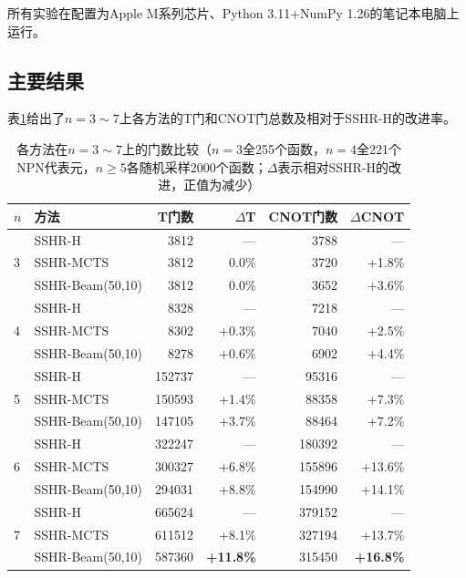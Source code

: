 \documentclass[10.5pt,compsoc,UTF8]{CjC}
\theoremstyle{mystyle}
\begin{document}
所有实验在配置为Apple M系列芯片、Python 3.11+NumPy 1.26的笔记本电脑上运行。

\subsection{\heiti 主要结果}

表\ref{tab:main-results}给出了$n=3\sim7$上各方法的T门和CNOT门总数及相对于SSHR-H的改进率。

\begin{table}[H]
  \centering
  \caption{各方法在$n=3\sim7$上的门数比较（$n=3$全255个函数，$n=4$全221个NPN代表元，$n\ge5$各随机采样2000个函数；$\Delta$表示相对SSHR-H的改进，正值为减少）}
  \label{tab:main-results}
  \setlength{\tabcolsep}{4pt}
  \begin{tabular}{llrrrr}
    \toprule
    $n$ & 方法 & T门数 & $\Delta$T & CNOT门数 & $\Delta$CNOT \\
    \midrule
    \multirow{3}{*}{3}
      & SSHR-H         & 3812 & --- & 3788 & --- \\
      & SSHR-MCTS      & 3812 & 0.0\% & 3720 & +1.8\% \\
      & SSHR-Beam(50,10) & 3812 & 0.0\% & 3652 & +3.6\% \\
    \midrule
    \multirow{3}{*}{4}
      & SSHR-H         & 8328 & --- & 7218 & --- \\
      & SSHR-MCTS      & 8302 & +0.3\% & 7040 & +2.5\% \\
      & SSHR-Beam(50,10) & 8278 & +0.6\% & 6902 & +4.4\% \\
    \midrule
    \multirow{3}{*}{5}
      & SSHR-H         & 152737 & --- & 95316 & --- \\
      & SSHR-MCTS      & 150593 & +1.4\% & 88358 & +7.3\% \\
      & SSHR-Beam(50,10) & 147105 & +3.7\% & 88464 & +7.2\% \\
    \midrule
    \multirow{3}{*}{6}
      & SSHR-H         & 322247 & --- & 180392 & --- \\
      & SSHR-MCTS      & 300327 & +6.8\% & 155896 & +13.6\% \\
      & SSHR-Beam(50,10) & 294031 & +8.8\% & 154990 & +14.1\% \\
    \midrule
    \multirow{3}{*}{7}
      & SSHR-H         & 665624 & --- & 379152 & --- \\
      & SSHR-MCTS      & 611512 & +8.1\% & 327194 & +13.7\% \\
      & SSHR-Beam(50,10) & 587360 & \textbf{+11.8\%} & 315450 & \textbf{+16.8\%} \\
    \bottomrule
  \end{tabular}
\end{table}
\end{document}
